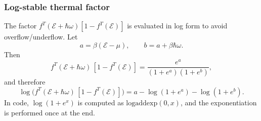 \subsubsection{Log-stable thermal factor}
The factor $f^{T}(\mathcal{E}+\hbar\omega)[1-f^{T}(\mathcal{E})]$ is evaluated in log form to avoid overflow/underflow. Let
\begin{equation}
a=\beta(\mathcal{E}-\mu),\qquad b=a+\beta\hbar\omega.
\label{eq:log_stable_definitions}
\end{equation}
Then
\begin{equation}
f^{T}(\mathcal{E}+\hbar\omega)\,[1-f^{T}(\mathcal{E})]
=\frac{e^{a}}{(1+e^{a})(1+e^{b})},
\label{eq:log_stable_fraction}
\end{equation}
and therefore
\begin{equation}
\log\!\Big(f^{T}(\mathcal{E}+\hbar\omega)\,[1-f^{T}(\mathcal{E})]\Big)
=a-\log(1+e^{a})-\log(1+e^{b}).
\label{eq:log_stable_log}
\end{equation}
In code, $\log(1+e^x)$ is computed as $\mathrm{logaddexp}(0,x)$, and the exponentiation is performed once at the end.
